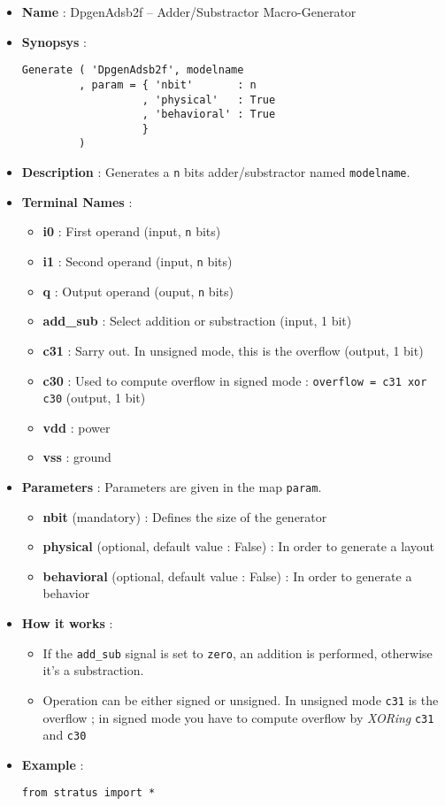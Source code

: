 \begin{itemize}
    \item \textbf{Name} : DpgenAdsb2f -- Adder/Substractor Macro-Generator
    \item \textbf{Synopsys} :
\begin{verbatim}
Generate ( 'DpgenAdsb2f', modelname
         , param = { 'nbit'       : n
                   , 'physical'   : True
                   , 'behavioral' : True
                   }
         )
\end{verbatim}
    \item \textbf{Description} : Generates a \verb-n- bits adder/substractor named \verb-modelname-.
    \item \textbf{Terminal Names} :
    \begin{itemize}
        \item \textbf{i0} : First operand (input, \verb-n- bits)
        \item \textbf{i1} : Second operand (input, \verb-n- bits)
        \item \textbf{q} : Output operand (ouput, \verb-n- bits)
        \item \textbf{add\_sub} : Select addition or substraction (input, 1 bit)
        \item \textbf{c31} : Sarry out. In unsigned mode, this is the overflow (output, 1 bit)
        \item \textbf{c30} : Used to compute overflow in signed mode : \verb-overflow = c31 xor c30- (output, 1 bit)
        \item \textbf{vdd} : power
        \item \textbf{vss} : ground
    \end{itemize}
    \item \textbf{Parameters} : Parameters are given in the map \verb-param-.
    \begin{itemize}
        \item \textbf{nbit} (mandatory) : Defines the size of the generator
        \item \textbf{physical} (optional, default value : False) : In order to generate a layout
        \item \textbf{behavioral} (optional, default value : False) : In order to generate a behavior
    \end{itemize}
    \item \textbf{How it works} :
    \begin{itemize}
        \item If the \verb-add_sub- signal is set to \verb-zero-, an addition is performed, otherwise it's a substraction.
        \item Operation can be either signed or unsigned. In unsigned mode \verb-c31- is the overflow ; in signed mode you have to compute overflow by \emph{XORing} \verb-c31- and \verb-c30-
    \end{itemize}    
    \item \textbf{Example} :
\begin{verbatim}
from stratus import *


\end{verbatim}
\end{itemize}
